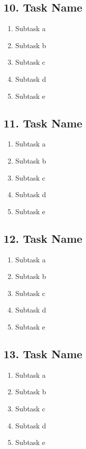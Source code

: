 \documentclass[12pt]{article}
\begin{document}
\subsection*{10. Task Name}
\begin{enumerate}[label=\alph*.]
    \item Subtask a
    \item Subtask b
    \item Subtask c
    \item Subtask d
    \item Subtask e
\end{enumerate}

\subsection*{11. Task Name}
\begin{enumerate}[label=\alph*.]
    \item Subtask a
    \item Subtask b
    \item Subtask c
    \item Subtask d
    \item Subtask e
\end{enumerate}

\subsection*{12. Task Name}
\begin{enumerate}[label=\alph*.]
    \item Subtask a
    \item Subtask b
    \item Subtask c
    \item Subtask d
    \item Subtask e
\end{enumerate}

\subsection*{13. Task Name}
\begin{enumerate}[label=\alph*.]
    \item Subtask a
    \item Subtask b
    \item Subtask c
    \item Subtask d
    \item Subtask e
\end{enumerate}
\end{document}

